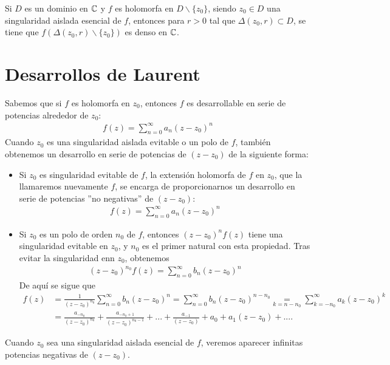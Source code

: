 \begin{teo}
    Si $D$ es un dominio en $\mathbb{C}$ y $f$ es holomorfa en $D \backslash \{z_0\}$, siendo $z_0 \in D$ una singularidad aislada esencial de $f$, entonces para $r>0$ tal que $\Delta(z_0,r) \subset D$, se tiene que $f(\Delta(z_0,r) \backslash \{z_0\})$ es denso en $\mathbb{C}$.
\end{teo}

\section{Desarrollos de Laurent}
Sabemos que si $f$ es holomorfa en $z_0$, entonces $f$ es desarrollable en serie de potencias alrededor de $z_0$:
\begin{align*}
    f(z) = \sum_{n=0}^{\infty}{a_n(z-z_0)^n}
\end{align*}
Cuando $z_0$ es una singularidad aislada evitable o un polo de $f$, también obtenemos un desarrollo en serie de potencias de $(z-z_0)$ de la siguiente forma:
\begin{itemize}
    \item Si $z_0$ es singularidad evitable de $f$, la extensión holomorfa de $f$ en $z_0$, que la llamaremos nuevamente $f$, se encarga de proporcionarnos un desarrollo en serie de potencias ''no negativas'' de $(z-z_0)$:
          \begin{align*}
              f(z) = \sum_{n=0}^{\infty}{a_n(z-z_0)^n}
          \end{align*}
    \item Si $z_0$ es un polo de orden $n_0$ de $f$, entonces $(z-z_0)^nf(z)$ tiene una singularidad evitable en $z_0$, y $n_0$ es el primer natural con esta propiedad. Tras evitar la singularidad enn $z_0$, obtenemos
          \begin{align*}
              (z-z_0)^{n_0}f(z) = \sum_{n=0}^{\infty}{b_n(z-z_0)^n}
          \end{align*}
          De aquí se sigue que
          \begin{align*}
              f(z) & = \frac{1}{(z-z_0)^{n_0}}\sum_{n=0}^{\infty}{b_n(z-z_0)^n} = \sum_{n=0}^{\infty}{b_n(z-z_0)^{n-n_0}} \underset{k = n-n_0}{=} \sum_{k=-n_0}^{\infty}{a_k(z-z_0)^k} \\
                   & = \frac{a_{-n_0}}{(z-z_0)^{n_0}} + \frac{a_{-n_0 +1}}{(z-z_0)^{n_0-1}} + ... + \frac{a_{-1}}{(z-z_0)} + a_0 + a_1(z-z_0)+ ....
          \end{align*}
\end{itemize}
Cuando $z_0$ sea una singularidad aislada esencial de $f$, veremos aparecer infinitas potencias negativas de $(z-z_0)$.

